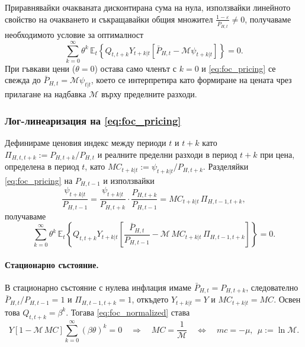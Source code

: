 Приравнявайки очакваната дисконтирана сума на нула, използвайки линейното свойство на очакването и съкращавайки общия множител $\frac{1-\varepsilon}{\bar{P}_{H,t}} \ne 0$, получаваме необходимото условие за оптималност
\begin{equation}
\sum_{k=0}^{\infty} \theta^k\, \mathbb{E}_t \left\{ Q_{t,t+k} Y_{t+k|t}
\left[ \bar{P}_{H,t} - \mathcal{M} \psi_{t+k|t} \right] \right\} = 0.
\label{eq:foc_pricing}
\end{equation}
При гъвкави цени ($\theta = 0$) остава само членът с $k = 0$ и \eqref{eq:foc_pricing} се свежда до $\bar{P}_{H,t} = \mathcal{M}\psi_{t|t}$, което се интерпретира като формиране на цената чрез прилагане на надбавка $\mathcal{M}$ върху пределните разходи.

\subsubsection*{Лог-линеаризация на \eqref{eq:foc_pricing}}

Дефинираме ценовия индекс между периоди $t$ и $t+k$ като $\Pi_{H,t,t+k} := P_{H,t+k}/P_{H,t}$ и реалните пределни разходи в период $t+k$ при цена, определена в период $t$, като $MC_{t+k|t} := \psi_{t+k|t}/P_{H,t+k}$. Разделяйки \eqref{eq:foc_pricing} на $P_{H,t-1}$ и използвайки
\[
\frac{\psi_{t+k|t}}{P_{H,t-1}} = \frac{\psi_{t+k|t}}{P_{H,t+k}} \cdot \frac{P_{H,t+k}}{P_{H,t-1}} = MC_{t+k|t}\, \Pi_{H,t-1,t+k},
\]
получаваме
\begin{equation}
\sum_{k=0}^{\infty} \theta^k\, \mathbb{E}_t \left\{ Q_{t,t+k} Y_{t+k|t}
\left[ \frac{\bar{P}_{H,t}}{P_{H,t-1}} - \mathcal{M}\, MC_{t+k|t}\, \Pi_{H,t-1,t+k} \right] \right\} = 0.
\label{eq:foc_normalized}
\end{equation}

\paragraph{Стационарно състояние.}
В стационарно състояние с нулева инфлация имаме $\bar{P}_{H,t} = P_{H,t+k}$, следователно $\bar{P}_{H,t}/P_{H,t-1} = 1$ и $\Pi_{H,t-1,t+k} = 1$, откъдето $Y_{t+k|t} = Y$ и $MC_{t+k|t} = MC$. Освен това $Q_{t,t+k} = \beta^k$. Тогава \eqref{eq:foc_normalized} става
\[
Y \left[ 1 - \mathcal{M}\, MC \right] \sum_{k=0}^{\infty} (\beta\theta)^k = 0
\quad \Longrightarrow \quad
MC = \frac{1}{\mathcal{M}}
\quad \Longleftrightarrow \quad
mc = -\mu, \ \ \mu := \ln \mathcal{M}.
\]


